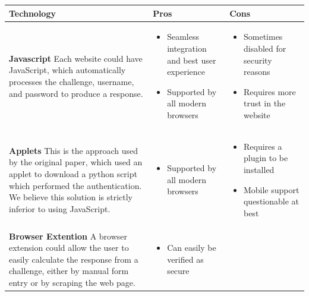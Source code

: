 \documentclass[11pt]{article}
\begin{document}
\small
\begin{center}
    \begin{tabular}{|  p{6cm} | p{5cm} | p{5cm} |}
    \hline
    Technology & Pros & Cons \\ \hline
    \vspace{.4cm}
    \textbf{Javascript}
    Each website could have JavaScript, which automatically processes the challenge, username, and password to produce a response. & 

    \begin{itemize}[leftmargin=*]
    \item  Seamless integration and best user experience

    \item  Supported by all modern browsers
    \end{itemize}
    &
    \begin{itemize}[leftmargin=*]
    \item Sometimes disabled for security reasons

    \item Requires more trust in the website
    \end{itemize}
    \\ \hline
    \vspace{.4cm}
    \textbf{Applets}
    This is the approach used by the original paper, which used an applet to download a python script which performed the authentication. We believe this solution is strictly inferior to using JavaScript.
    &
    \begin{itemize}[leftmargin=*]
    \item  Supported by all modern browsers
    \end{itemize}
    &
    \begin{itemize}[leftmargin=*]
    \item Requires a plugin to be installed

    \item Mobile support questionable at best
    \end{itemize}

    \\ \hline
    \vspace{.4cm}
    \textbf{Browser Extention}
    A browser extension could allow the user to easily calculate the response from a challenge, either by manual form entry or by scraping the web page.

    &
    \begin{itemize}[leftmargin=*]
    \item Can easily be verified as secure


\end{itemize}
\end{tabular}
\end{center}
\end{document}
